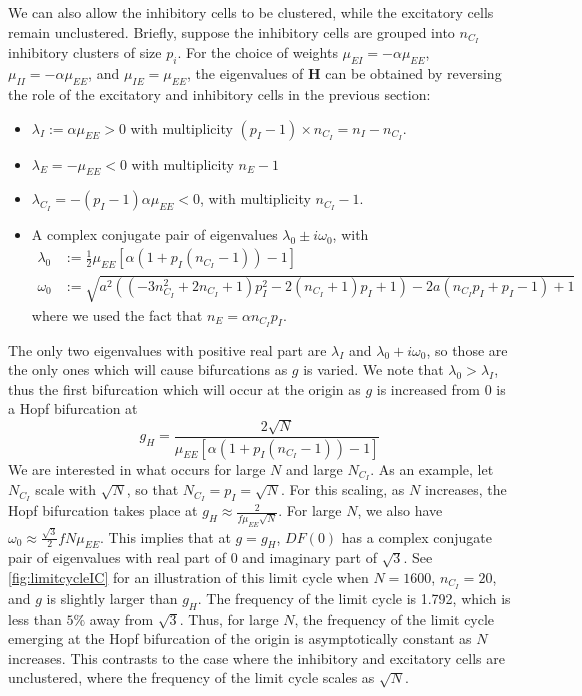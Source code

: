 \documentclass[11pt,reqno]{amsart}
\newcommand{\Hvec}{\mathbf{H}}
\begin{document}
We can also allow the inhibitory cells to be clustered, while the excitatory cells remain unclustered. Briefly, suppose the inhibitory cells are grouped into $n_{C_I}$ inhibitory clusters of size $p_i$. For the choice of weights $\mu_{EI} = -\alpha \mu_{EE}$, $\mu_{II} = -\alpha \mu_{EE}$, and $\mu_{IE} = \mu_{EE}$, the eigenvalues of $\Hvec$ can be obtained by reversing the role of the excitatory and inhibitory cells in the previous section:
\begin{itemize}
\item $\lambda_I := \alpha \mu_{EE} > 0$ with multiplicity $(p_I-1) \times n_{C_I} = n_I - n_{C_I}$.
\item $\lambda_E = -\mu_{EE} < 0$ with multiplicity $n_E - 1$
\item $\lambda_{C_I} = -(p_I-1)\alpha \mu_{EE} < 0$, with multiplicity $n_{C_I}-1$.
\item A complex conjugate pair of eigenvalues $\lambda_0 \pm i \omega_0$, with 
\begin{align*}
    \lambda_0 &:= \frac{1}{2}\mu_{EE} \left[ \alpha( 1 + p_I(n_{C_I}-1)) -1 \right]
      \\
    \omega_0 &:= \sqrt{a^2 \left(\left(-3 n_{C_I}^2+2 n_{C_I}+1\right) p_I^2-2 (n_{C_I}+1) p_I+1\right)-2 a
    (n_{C_I}p_I +p_I -1)+1}
\end{align*}
where we used the fact that $n_E = \alpha n_{C_I} p_I$.
\end{itemize}
The only two eigenvalues with positive real part are $\lambda_I$ and $\lambda_0 + i \omega_0$, so those are the only ones which will cause bifurcations as $g$ is varied. We note that $\lambda_0 > \lambda_I$, thus the first bifurcation which will occur at the origin as $g$ is increased from 0 is a Hopf bifurcation at 
\[
g_H = \frac{2 \sqrt{N}}{\mu_{EE} \left[ \alpha( 1 + p_I(n_{C_I}-1)) -1 \right] }
\]
We are interested in what occurs for large $N$ and large $N_{C_I}$. As an example, let $N_{C_I}$ scale with $\sqrt{N}$, so that $N_{C_I} = p_I = \sqrt{N}$. For this scaling, as $N$ increases, the Hopf bifurcation takes place at $g_H \approx \frac{2}{f \mu_{EE} \sqrt{N}}$. For large $N$, we also have $\omega_0 \approx \frac{\sqrt{3}}{2}f N \mu_{EE}$. This implies that at $g = g_H$, $DF(0)$ has a complex conjugate pair of eigenvalues with real part of 0 and imaginary part of $\sqrt{3}$. See \cref{fig:limitcycleIC} for an illustration of this limit cycle when $N=1600$, $n_{C_I}=20$, and $g$ is slightly larger than $g_H$. The frequency of the limit cycle is 1.792, which is less than $5\%$ away from $\sqrt{3}$. Thus, for large $N$, the frequency of the limit cycle emerging at the Hopf bifurcation of the origin is asymptotically constant as $N$ increases. This contrasts to the case where the inhibitory and excitatory cells are unclustered, where the frequency of the limit cycle scales as $\sqrt{N}$.
\end{document}

